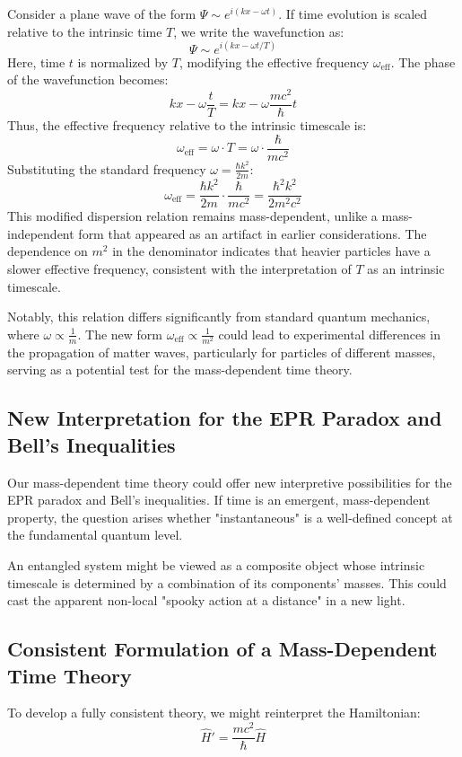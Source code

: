 \documentclass{article}
\begin{document}
Consider a plane wave of the form \(\Psi \sim e^{i(kx - \omega t)}\). If time evolution is scaled relative to the intrinsic time \(T\), we write the wavefunction as:
\[
\Psi \sim e^{i(kx - \omega t / T)}
\]
Here, time \(t\) is normalized by \(T\), modifying the effective frequency \(\omega_{\text{eff}}\). The phase of the wavefunction becomes:
\[
kx - \omega \frac{t}{T} = kx - \omega \frac{mc^2}{\hbar} t
\]
Thus, the effective frequency relative to the intrinsic timescale is:
\[
\omega_{\text{eff}} = \omega \cdot T = \omega \cdot \frac{\hbar}{mc^2}
\]
Substituting the standard frequency \(\omega = \frac{\hbar k^2}{2m}\):
\[
\omega_{\text{eff}} = \frac{\hbar k^2}{2m} \cdot \frac{\hbar}{mc^2} = \frac{\hbar^2 k^2}{2 m^2 c^2}
\]
This modified dispersion relation remains mass-dependent, unlike a mass-independent form that appeared as an artifact in earlier considerations. The dependence on \(m^2\) in the denominator indicates that heavier particles have a slower effective frequency, consistent with the interpretation of \(T\) as an intrinsic timescale.

Notably, this relation differs significantly from standard quantum mechanics, where \(\omega \propto \frac{1}{m}\). The new form \(\omega_{\text{eff}} \propto \frac{1}{m^2}\) could lead to experimental differences in the propagation of matter waves, particularly for particles of different masses, serving as a potential test for the mass-dependent time theory.
\subsection{New Interpretation for the EPR Paradox and Bell's Inequalities}

Our mass-dependent time theory could offer new interpretive possibilities for the EPR paradox and Bell's inequalities. If time is an emergent, mass-dependent property, the question arises whether "instantaneous" is a well-defined concept at the fundamental quantum level.

An entangled system might be viewed as a composite object whose intrinsic timescale is determined by a combination of its components' masses. This could cast the apparent non-local "spooky action at a distance" in a new light.

\subsection{Consistent Formulation of a Mass-Dependent Time Theory}

To develop a fully consistent theory, we might reinterpret the Hamiltonian:
\[
\hat{H}' = \frac{mc^2}{\hbar} \hat{H}
\]
\end{document}
